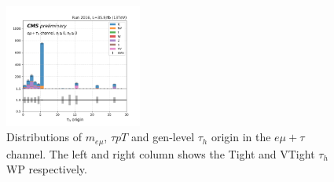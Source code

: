 \begin{figure}
    \includegraphics[width=0.4\textwidth]{chapters/Appendix/sectionJetToTauh/figures/emutau_tauGenFlavor_pickles_lltauVTight.png}
    \caption{Distributions of $m_{e\mu}$, $\tau pT$ and gen-level $\tau_h$ origin in the $e\mu+\tau$ channel. The left and right column shows the Tight and VTight $\tau_h$ WP respectively.}
    \label{fig:appendix:fakeTauId:emutau}
\end{figure}

